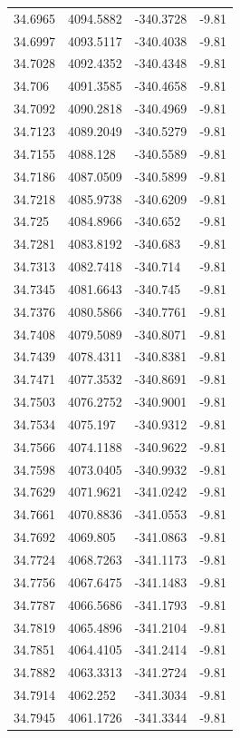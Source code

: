 \begin{table}[H]
\begin{tabular}{llll}
34.6965 & 4094.5882 & -340.3728 & -9.81 \\
34.6997 & 4093.5117 & -340.4038 & -9.81 \\
34.7028 & 4092.4352 & -340.4348 & -9.81 \\
34.706 & 4091.3585 & -340.4658 & -9.81 \\
34.7092 & 4090.2818 & -340.4969 & -9.81 \\
34.7123 & 4089.2049 & -340.5279 & -9.81 \\
34.7155 & 4088.128 & -340.5589 & -9.81 \\
34.7186 & 4087.0509 & -340.5899 & -9.81 \\
34.7218 & 4085.9738 & -340.6209 & -9.81 \\
34.725 & 4084.8966 & -340.652 & -9.81 \\
34.7281 & 4083.8192 & -340.683 & -9.81 \\
34.7313 & 4082.7418 & -340.714 & -9.81 \\
34.7345 & 4081.6643 & -340.745 & -9.81 \\
34.7376 & 4080.5866 & -340.7761 & -9.81 \\
34.7408 & 4079.5089 & -340.8071 & -9.81 \\
34.7439 & 4078.4311 & -340.8381 & -9.81 \\
34.7471 & 4077.3532 & -340.8691 & -9.81 \\
34.7503 & 4076.2752 & -340.9001 & -9.81 \\
34.7534 & 4075.197 & -340.9312 & -9.81 \\
34.7566 & 4074.1188 & -340.9622 & -9.81 \\
34.7598 & 4073.0405 & -340.9932 & -9.81 \\
34.7629 & 4071.9621 & -341.0242 & -9.81 \\
34.7661 & 4070.8836 & -341.0553 & -9.81 \\
34.7692 & 4069.805 & -341.0863 & -9.81 \\
34.7724 & 4068.7263 & -341.1173 & -9.81 \\
34.7756 & 4067.6475 & -341.1483 & -9.81 \\
34.7787 & 4066.5686 & -341.1793 & -9.81 \\
34.7819 & 4065.4896 & -341.2104 & -9.81 \\
34.7851 & 4064.4105 & -341.2414 & -9.81 \\
34.7882 & 4063.3313 & -341.2724 & -9.81 \\
34.7914 & 4062.252 & -341.3034 & -9.81 \\
34.7945 & 4061.1726 & -341.3344 & -9.81 \\

\end{tabular}
\end{table}
